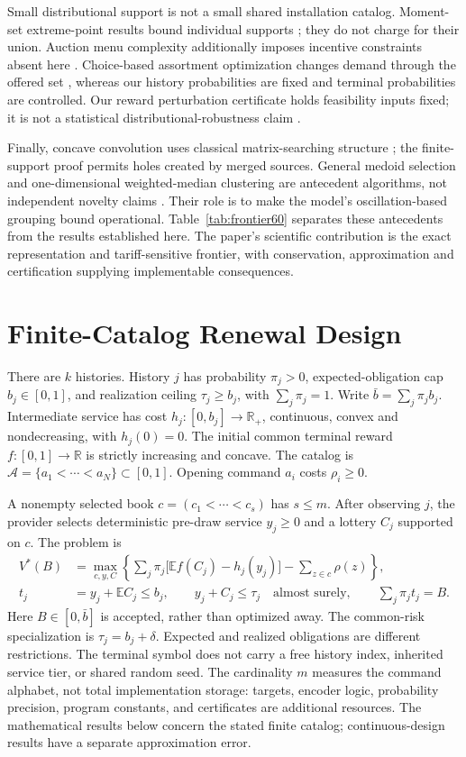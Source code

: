 \documentclass[11pt,letterpaper]{article}
\theoremstyle{definition}\newtheorem{remark}[theorem]{Remark}
\begin{document}
Small distributional support is not a small shared installation catalog. Moment-set extreme-point results bound individual supports \citep{Winkler1988}; they do not charge for their union. Auction menu complexity additionally imposes incentive constraints absent here \citep{HartNisan2013,Babaioff2016}. Choice-based assortment optimization changes demand through the offered set \citep{Rusmevichientong2010}, whereas our history probabilities are fixed and terminal probabilities are controlled. Our reward perturbation certificate holds feasibility inputs fixed; it is not a statistical distributional-robustness claim \citep{EsfahaniKuhn2018}.

Finally, concave convolution uses classical matrix-searching structure \citep{Aggarwal1987}; the finite-support proof permits holes created by merged sources. General medoid selection and one-dimensional weighted-median clustering are antecedent algorithms, not independent novelty claims \citep{Arya2004,Wu1991}. Their role is to make the model's oscillation-based grouping bound operational. Table~\ref{tab:frontier60} separates these antecedents from the results established here. The paper's scientific contribution is the exact representation and tariff-sensitive frontier, with conservation, approximation and certification supplying implementable consequences.
\section{Finite-Catalog Renewal Design}\label{sec:model52}
There are $k$ histories. History $j$ has probability $\pi_j>0$, expected-obligation cap $b_j\in[0,1]$, and realization ceiling $\tau_j\geq b_j$, with $\sum_j\pi_j=1$. Write $\bar b=\sum_j\pi_jb_j$. Intermediate service has cost $h_j:[0,b_j]\to\mathbb R_+$, continuous, convex and nondecreasing, with $h_j(0)=0$. The initial common terminal reward $f:[0,1]\to\mathbb R$ is strictly increasing and concave. The catalog is $\mathcal A=\{a_1<\cdots<a_N\}\subset[0,1]$. Opening command $a_i$ costs $\rho_i\geq0$.

A nonempty selected book $c=(c_1<\cdots<c_s)$ has $s\leq m$. After observing $j$, the provider selects deterministic pre-draw service $y_j\geq0$ and a lottery $C_j$ supported on $c$. The problem is
\begin{align}
 V^*(B)&=\max_{c,y,C}\left\{\sum_j\pi_j\bigl[\mathbb E f(C_j)-h_j(y_j)\bigr]-\sum_{z\in c}\rho(z)\right\},\label{eq:original52}\\
 t_j&=y_j+\mathbb E C_j\leq b_j,\qquad y_j+C_j\leq\tau_j\quad\text{almost surely},\qquad \sum_j\pi_jt_j=B.\label{eq:constraints52}
\end{align}
Here $B\in[0,\bar b]$ is accepted, rather than optimized away. The common-risk specialization is $\tau_j=b_j+\delta$. Expected and realized obligations are different restrictions. The terminal symbol does not carry a free history index, inherited service tier, or shared random seed. The cardinality $m$ measures the command alphabet, not total implementation storage: targets, encoder logic, probability precision, program constants, and certificates are additional resources. The mathematical results below concern the stated finite catalog; continuous-design results have a separate approximation error.
\end{document}

